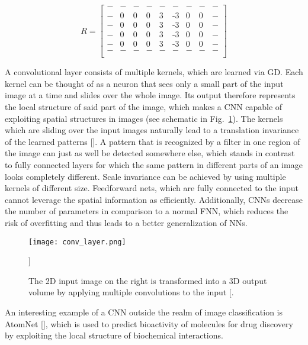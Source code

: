 \begin{equation}
  \newcommand{\nan}{-}
  \newcommand{\minus}{\text{-}}
	R = \begin{bmatrix}
    \nan & \nan & \nan & \nan & \nan & \nan  & \nan & \nan & \nan\\
    \nan & 0 & 0 & 0 & 3 & \minus 3 & 0 & 0 & \nan\\
    \nan & 0 & 0 & 0 & 3 & \minus 3 & 0 & 0 & \nan\\
    \nan & 0 & 0 & 0 & 3 & \minus 3 & 0 & 0 & \nan\\
    \nan & 0 & 0 & 0 & 3 & \minus 3 & 0 & 0 & \nan\\
    \nan & \nan & \nan & \nan & \nan & \nan  & \nan & \nan & \nan\\
  \end{bmatrix}
\end{equation}

A convolutional layer consists of multiple kernels, which are learned via GD.
Each kernel can be thought of as a neuron that sees only a small part of the
input image at a time and slides over the whole image. Its output therefore
represents the local structure of said part of the image, which makes
a CNN capable of exploiting spatial structures in images (see schematic in
Fig.~\ref{fig:conv_layer}).  The kernels which are sliding over the input
images naturally lead to a translation invariance of the learned patterns
[\cite{lecun1995convolutional}]. A pattern that is recognized by a filter in one
region of the image can just as well be detected somewhere else, which stands
in contrast to fully connected layers for which the same pattern in different
parts of an image looks completely different.  Scale invariance can be achieved
by using multiple kernels of different size.  Feedforward nets, which are fully
connected to the input cannot leverage the spatial information as efficiently.
Additionally, CNNs decrease the number of parameters in comparison to a normal
FNN, which reduces the risk of overfitting and thus leads to a better
generalization of NNs.
\begin{figure}
  \centering
  \texttt{[image: conv\_layer.png]}
  \caption{The 2D input image on the right is transformed into a 3D output
  volume by applying multiple convolutions to the input [\cite{conv_layer_wiki}.}]
  \label{fig:conv_layer}
\end{figure}

An interesting example of a CNN outside the realm of image classification is
AtomNet [\cite{dzamba1510atomnet}], which is used to predict bioactivity of
molecules for drug discovery by exploiting the local structure of biochemical
interactions.


